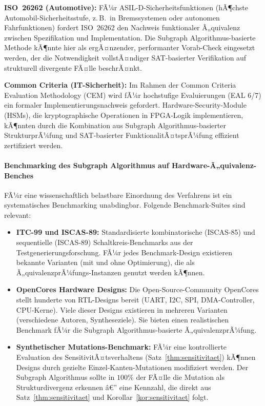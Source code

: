﻿\documentclass[12pt,a4paper]{report}
\begin{document}
\textbf{ISO~26262 (Automotive):} FÃ¼r ASIL-D-Sicherheitsfunktionen (hÃ¶chste
Automobil-Sicherheitsstufe, z.\,B.\ in Bremssystemen oder autonomen Fahrfunktionen)
fordert ISO~26262 den Nachweis funktionaler Ã„quivalenz zwischen Spezifikation und
Implementation. Die Subgraph Algorithmus-basierte Methode kÃ¶nnte hier als
ergÃ¤nzender, performanter Vorab-Check eingesetzt werden, der die Notwendigkeit
vollstÃ¤ndiger SAT-basierter Verifikation auf strukturell divergente FÃ¤lle beschrÃ¤nkt.

\textbf{Common Criteria (IT-Sicherheit):} Im Rahmen der Common Criteria Evaluation
Methodology (CEM) wird fÃ¼r hochstufige Evaluierungen (EAL 6/7) ein formaler
Implementierungsnachweis gefordert. Hardware-Security-Module (HSMs), die kryptographische
Operationen in FPGA-Logik implementieren, kÃ¶nnten durch die Kombination aus
Subgraph Algorithmus-basierter StrukturprÃ¼fung und SAT-basierter FunktionalitÃ¤tsprÃ¼fung
effizient zertifiziert werden.

\paragraph{Benchmarking des Subgraph Algorithmus auf Hardware-Ã„quivalenz-Benches}

FÃ¼r eine wissenschaftlich belastbare Einordnung des Verfahrens ist ein systematisches
Benchmarking unabdingbar. Folgende Benchmark-Suites sind relevant:

\begin{itemize}
    \item \textbf{ITC-99 und ISCAS-89:} Standardisierte kombinatorische (ISCAS-85) und
          sequentielle (ISCAS-89) Schaltkreis-Benchmarks aus der Testgenerierungsforschung.
          FÃ¼r jedes Benchmark-Design existieren bekannte Varianten (mit und ohne
          Optimierung), die als Ã„quivalenzprÃ¼fungs-Instanzen genutzt werden kÃ¶nnen.
    \item \textbf{OpenCores Hardware Designs:} Die Open-Source-Community OpenCores stellt
          hunderte von RTL-Designs bereit (UART, I2C, SPI, DMA-Controller, CPU-Kerne).
          Viele dieser Designs existieren in mehreren Varianten (verschiedene Autoren,
          Syntheseziele). Sie bieten einen realistischen Benchmark fÃ¼r die
          Subgraph Algorithmus-basierte Ã„quivalenzprÃ¼fung.
    \item \textbf{Synthetischer Mutations-Benchmark:} FÃ¼r eine kontrollierte Evaluation
          des SensitivitÃ¤tsverhaltens (Satz~\ref{thm:sensitivitaet}) kÃ¶nnen Designs
          durch gezielte Einzel-Kanten-Mutationen modifiziert werden.
          Der Subgraph Algorithmus sollte in $100\%$ der FÃ¤lle die Mutation als
          Strukturdivergenz erkennen â€” eine Kennzahl, die direkt aus
          Satz~\ref{thm:sensitivitaet} und Korollar~\ref{kor:sensitivitaet} folgt.
\end{itemize}
\end{document}
